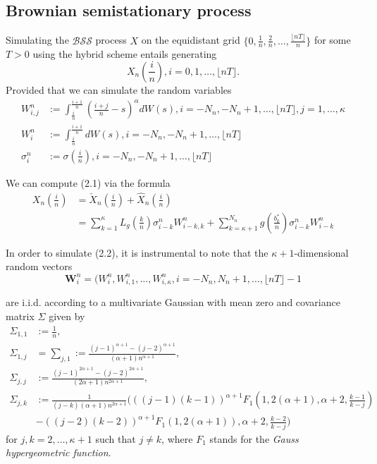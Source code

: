 \documentclass[12pt]{article}
\numberwithin{equation}{section}
\begin{document}
\subsection{Brownian semistationary process}
Simulating the $\mathcal{BSS}$ process $X$ on the equidistant grid $ \{0, \frac{1}{n}, \frac{2}{n}, \dots, \frac{\lfloor nT \rfloor}{n} \} $ for some $T>0$ using the hybrid scheme entails generating
\begin{equation}
  X_n(\frac{i}{n}), i = 0, 1, \dots, \lfloor nT \rfloor.
\end{equation}
Provided that we can simulate the random variables
\begin{equation}
  \begin{split}
    W_{i,j}^n &:= \int_{\frac{i}{n}}^{\frac{i+1}{n}} (\frac{i+j}{n} - s) ^ \alpha dW(s), i = -N_n, -N_n+1, \dots, \lfloor nT \rfloor, j = 1,\dots,\kappa \\
    W_{i}^n &:= \int_{\frac{i}{n}}^{\frac{i+1}{n}} dW(s), i = -N_n, -N_n+1, \dots, \lfloor nT \rfloor \\
    \sigma_i^n &:= \sigma\left(\frac{i}{n}\right), i = -N_n, -N_n+1, \dots, \lfloor nT \rfloor
  \end{split}
\end{equation}

We can compute (2.1) via the formula
\begin{equation}
  \begin{split}
    X_n(\frac{i}{n}) &= \check{X}_n(\frac{i}{n}) + \hat{X}_n (\frac{i}{n}) \\
    &= \sum_{k=1}^{\kappa} L_g\left(\frac{k}{n}\right)\sigma_{i-k}^n W_{i-k,k}^n + \sum_{k=\kappa+1}^{N_n} g\left(\frac{b_k^*}{n}\right) \sigma_{i-k}^nW_{i-k}^n 
  \end{split}
\end{equation}

In order to simulate (2.2), it is instrumental to note that the $\kappa+1$-dimensional random vectors
\begin{equation}
  \bm{W}_i^n = (W_i^n, W_{i,1}^n, \dots, W_{i, \kappa}^n, i = -N_n, N_n+1, \dots, \lfloor nT\rfloor-1
\end{equation}

are i.i.d. according to a multivariate Gaussian with mean zero and covariance matrix $\Sigma$ given by
\begin{equation}
  \begin{split}
    \Sigma_{1,1} &:= \frac{1}{n}, \\
    \Sigma_{1,j} &= \sum_{j,1} := \frac{(j-1)^{\alpha+1}-(j-2)^{\alpha+1}}{(\alpha+1)n^{\alpha+1}}, \\
    \Sigma_{j,j} &:= \frac{(j-1)^{2\alpha+1}-(j-2)^{2\alpha+1}}{(2\alpha+1)n^{2\alpha+1}}, \\
    \Sigma_{j,k} &:= \frac{1}{(j-k)(\alpha+1)n^{2\alpha+1}} ( ((j-1)(k-1))^{\alpha+1} F_1(1,2(\alpha+1),\alpha+2,\frac{k-1}{k-j}) \\
    & - ((j-2)(k-2))^{\alpha+1} F_1(1,2(\alpha+1)),\alpha+2,\frac{k-2}{k-j}) 
  \end{split}
\end{equation}
for $j,k=2,\dots,\kappa+1$ such that $j\neq k$, where $F_1$ stands for the \textit{Gauss hypergeometric function}.
\end{document}
